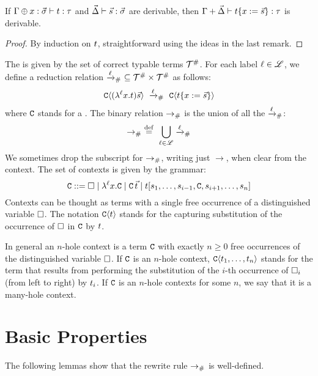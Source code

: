 \begin{lemma}
If $\Gamma \oplus x : \vec{\sigma} \vdash t : \tau$
and $\vec{\Delta} \vdash \vec{s} : \vec{\sigma}$
are derivable,
then $\Gamma + \vec{\Delta} \vdash t\{x := \vec{s}\} : \tau$
is derivable.
\end{lemma}
\begin{proof}
By induction on $t$, straightforward using the ideas in the last remark.
\end{proof}



\begin{definition}
The  is given by the set of correct typable terms $\mathcal{T}^{\mathtt{\#}}$.
For each label $\ell \in \mathscr{L}$, we define a reduction relation $\mathrel{\xrightarrow{\ell}_{\mathtt{\#}}}\ \subseteq \mathcal{T}^{\mathtt{\#}} \times \mathcal{T}^{\mathtt{\#}}$
as follows:
\[
  \conof{(\lamp{\lab}{\var}{\tm})\vec{\tmtwo}}
  \ \todistl{\lab}\ %
  \conof{\subs{\tm}{\var}{\vec{\tmtwo}}}
\]
where $\mathtt{C}$ stands for a .
The binary relation $\mathrel{\to_{\mathtt{\#}}}$ is the union of all the $\mathrel{\xrightarrow{\ell}_{\mathtt{\#}}}$:
\[
  \mathrel{\to_{\mathtt{\#}}} \ \overset{\mathrm{def}}{=}\ \bigcup_{\ell \in \mathscr{L}}\mathrel{\xrightarrow{\ell}_{\mathtt{\#}}}
\]
We sometimes drop the subscript for $\mathrel{\to_{\mathtt{\#}}}$, writing just $\to$, when clear from the context.
The set of contexts is given by the grammar:
\[
  \mathtt{C} ::= \Box \mid \lambda^{\ell} x. \mathtt{C} \mid \mathtt{C}\,\vec{t} \mid t[s_1,\hdots,s_{i-1},\mathtt{C},s_{i+1},\hdots,s_n]
\]
Contexts can be thought as terms with a single free occurrence of a distinguished variable $\Box$.
The notation $\mathtt{C}\langle t\rangle$ stands for the capturing substitution of the occurrence of $\Box$ in $\mathtt{C}$ by $t$.

In general an $n$-hole context is a term $\mathtt{C}$ with exactly $n \geq 0$ free occurrences of the distinguished variable $\Box$.
If $\mathtt{C}$ is an $n$-hole context, $\mathtt{C}\langle t_1,\hdots,t_n\rangle$ stands for the term
that results from performing the substitution of the $i$-th occurrence of $\Box_i$ (from left to right)
by $t_i$.
If $\mathtt{C}$ is an $n$-hole contexts for some $n$, we say that it is a many-hole context.
\end{definition}

\section{Basic Properties}

The following lemmas show that the rewrite rule $\mathrel{\to_{\mathtt{\#}}}$ is well-defined.

